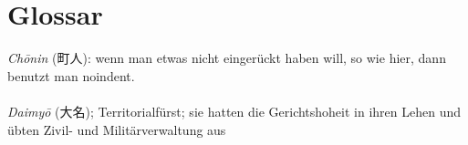 \newpage

\section{Glossar}

\noindent\textsl{Chōnin} (町人): wenn man etwas nicht eingerückt haben will, so wie hier, dann benutzt man noindent.\\
\\
\textsl{Daimyō} (大名); Territorialfürst; sie hatten die Gerichtshoheit in ihren Lehen und übten Zivil- und Militärverwaltung aus\\

